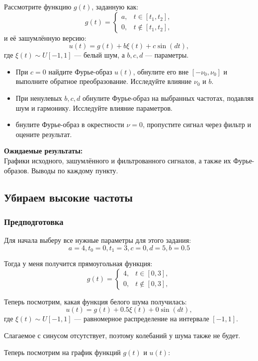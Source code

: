 \documentclass[a4paper,12pt]{article}
\begin{document}
Рассмотрите функцию \( g(t) \), заданную как:
\[
g(t) = 
\begin{cases} 
a, & t \in [t_1, t_2], \\
0, & t \notin [t_1, t_2],
\end{cases}
\]
и её зашумлённую версию:
\[
u(t) = g(t) + b\xi(t) + c \sin(dt),
\]
где \(\xi(t) \sim U[-1, 1]\) — белый шум, а \( b, c, d \) — параметры.

\begin{itemize}
\item При \( c = 0 \) найдите Фурье-образ \( u(t) \), обнулите его вне \([- \nu_0, \nu_0]\) и выполните обратное преобразование. Исследуйте влияние \( \nu_0 \) и \( b \).

\item При ненулевых \( b, c, d \) обнулите Фурье-образ на выбранных частотах, подавляя шум и гармонику. Исследуйте влияние параметров.

\item бнулите Фурье-образ в окрестности \( \nu = 0 \), пропустите сигнал через фильтр и оцените результат.
\end{itemize}
\textbf{Ожидаемые результаты:} \\
Графики исходного, зашумлённого и фильтрованного сигналов, а также их Фурье-образов. Выводы по каждому пункту.

\subsection{Убираем высокие частоты}
\subsubsection{Предподготовка}
Для начала выберу все нужные параметры для этого задания:
\[
a = 4, t_0 = 0, t_1 = 3, c = 0, d = 5, b = 0.5
\]

Тогда у меня получится прямоугольная функция:\[
g(t) = 
\begin{cases} 
4, & t \in [0, 3], \\
0, & t \notin [0, 3],
\end{cases}
\]

Теперь посмотрим, какая функция белого шума получилась:
\[
u(t) = g(t) + 0.5\xi(t) + 0\sin(dt),
\]
где \(\xi(t) \sim U[-1, 1]\) — равномерное распределение на интервале \([-1, 1]\).

Слагаемое с синусом отсутствует, поэтому колебаний у шума также не будет. 

Теперь посмотрим на график функций \(g(t)\) и \(u(t)\):
\end{document}
